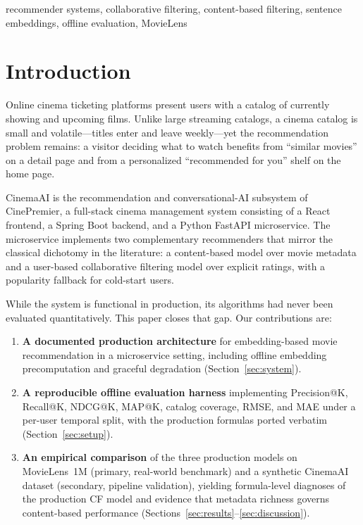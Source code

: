 \documentclass[conference]{IEEEtran}
\begin{document}
\begin{IEEEkeywords}
recommender systems, collaborative filtering, content-based filtering,
sentence embeddings, offline evaluation, MovieLens
\end{IEEEkeywords}

\section{Introduction}
Online cinema ticketing platforms present users with a catalog of currently
showing and upcoming films. Unlike large streaming catalogs, a cinema catalog
is small and volatile---titles enter and leave weekly---yet the recommendation
problem remains: a visitor deciding what to watch benefits from ``similar
movies'' on a detail page and from a personalized ``recommended for you'' shelf
on the home page.

CinemaAI is the recommendation and conversational-AI subsystem of CinePremier,
a full-stack cinema management system consisting of a React frontend, a Spring
Boot backend, and a Python FastAPI microservice. The microservice implements
two complementary recommenders that mirror the classical dichotomy in the
literature: a content-based model over movie metadata and a user-based
collaborative filtering model over explicit ratings, with a popularity fallback
for cold-start users.

While the system is functional in production, its algorithms had never been
evaluated quantitatively. This paper closes that gap. Our contributions are:
\begin{enumerate}
  \item \textbf{A documented production architecture} for embedding-based movie
  recommendation in a microservice setting, including offline embedding
  precomputation and graceful degradation (Section~\ref{sec:system}).
  \item \textbf{A reproducible offline evaluation harness} implementing
  Precision@K, Recall@K, NDCG@K, MAP@K, catalog coverage, RMSE, and MAE under a
  per-user temporal split, with the production formulas ported verbatim
  (Section~\ref{sec:setup}).
  \item \textbf{An empirical comparison} of the three production models on
  MovieLens~1M (primary, real-world benchmark) and a synthetic CinemaAI dataset
  (secondary, pipeline validation), yielding formula-level diagnoses of the
  production CF model and evidence that metadata richness governs content-based
  performance (Sections~\ref{sec:results}--\ref{sec:discussion}).
\end{enumerate}
\end{document}
